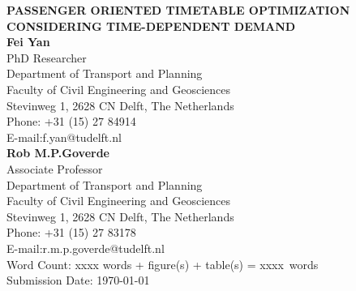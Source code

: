 \documentclass[titlepage,oneside,letterpage,12pt]{article}
\newcounter{totalwordcounter}
\newcounter{wordcounter}
\newcommand{\wordfigure}{250} %
\newcommand{\wordtable}{250} %
\newcommand{\totalwordcount}{%
  \wordcount*%
  \setcounter{totalwordcounter}{\value{wordcounter}}%
  \addtocounter{totalwordcounter}{\numexpr\wordfigure*\totvalue{figure}}%
  \addtocounter{totalwordcounter}{\numexpr\wordtable*\totvalue{table}} %
  \number\value{totalwordcounter}%
  \renewcommand{\totalwordcount}{\number\value{totalwordcounter}}%
}
\begin{document}
%
%
%
	
\thispagestyle{empty}

\pagewiselinenumbers %

\begin{titlepage}
\begin{flushleft}
{\MakeUppercase{\bfseries Passenger oriented timetable optimization considering time-dependent demand}}\\[36pt]

{\bfseries Fei Yan} \\
PhD Researcher\\
Department of Transport and Planning\\
Faculty of Civil Engineering and Geosciences\\
Stevinweg 1, 2628 CN Delft, The Netherlands\\
Phone: +31 (15) 27 84914\\
E-mail:{f.yan@tudelft.nl} \\[12pt]

{\bfseries Rob M.P.Goverde}\\
Associate Professor\\
Department of Transport and Planning\\
Faculty of Civil Engineering and Geosciences\\
Stevinweg 1, 2628 CN Delft, The Netherlands\\
Phone: +31 (15) 27 83178\\
E-mail:{r.m.p.goverde@tudelft.nl} \\[12pt]

Word Count: xxxx words +  figure(s) +  table(s) = xxxx~words \\[12pt]

Submission Date: \today
\end{flushleft}
\end{titlepage}
\end{document}
